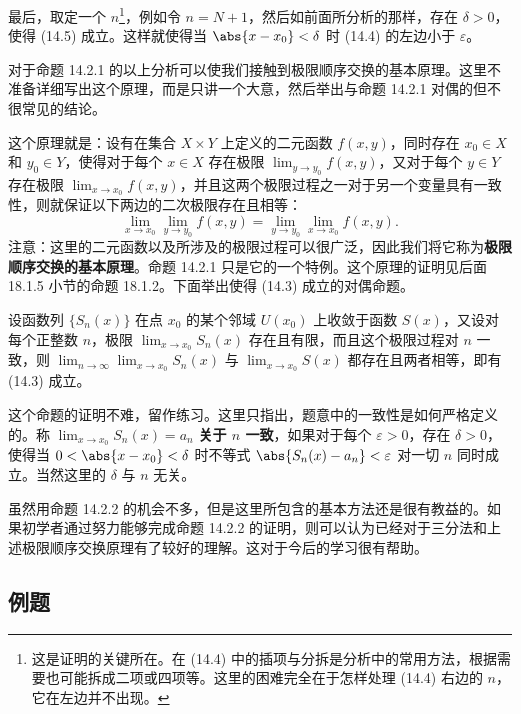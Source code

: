 最后，取定一个 $n$\footnote{这是证明的关键所在。在 (14.4) 中的插项与分拆是分析中的常用方法，根据需要也可能拆成二项或四项等。这里的困难完全在于怎样处理 (14.4) 右边的 $n$，它在左边并不出现。}，例如令 $n=N+1$，然后如前面所分析的那样，存在 $\delta>0$，使得 (14.5) 成立。这样就使得当 $\abs{x-x_0}<\delta$ 时 (14.4) 的左边小于 $\varepsilon$。

\begin{xremark}
对于命题 14.2.1 的以上分析可以使我们接触到极限顺序交换的基本原理。这里不准备详细写出这个原理，而是只讲一个大意，然后举出与命题 14.2.1 对偶的但不很常见的结论。
\end{xremark}

这个原理就是：设有在集合 $X\times Y$ 上定义的二元函数 $f(x,y)$，同时存在 $x_0\in X$ 和 $y_0\in Y$，使得对于每个 $x\in X$ 存在极限 $\displaystyle\lim_{y\to y_0}f(x,y)$，又对于每个 $y\in Y$ 存在极限 $\displaystyle\lim_{x\to x_0}f(x,y)$，并且这两个极限过程之一对于另一个变量具有一致性，则就保证以下两边的二次极限存在且相等：
\[
  \lim_{x\to x_0}\lim_{y\to y_0}f(x,y)=\lim_{y\to y_0}\lim_{x\to x_0}f(x,y).
\]
注意：这里的二元函数以及所涉及的极限过程可以很广泛，因此我们将它称为\textbf{极限顺序交换的基本原理}。命题 14.2.1 只是它的一个特例。这个原理的证明见后面 18.1.5 小节的命题 18.1.2。下面举出使得 (14.3) 成立的对偶命题。

\begin{xproposition}[14.2.2]
设函数列 $\{S_n(x)\}$ 在点 $x_0$ 的某个邻域 $U(x_0)$ 上收敛于函数 $S(x)$，又设对每个正整数 $n$，极限 $\displaystyle\lim_{x\to x_0}S_n(x)$ 存在且有限，而且这个极限过程对 $n$ 一致，则 $\displaystyle\lim_{n\to\infty}\lim_{x\to x_0}S_n(x)$ 与 $\displaystyle\lim_{x\to x_0}S(x)$ 都存在且两者相等，即有 (14.3) 成立。
\end{xproposition}

这个命题的证明不难，留作练习。这里只指出，题意中的一致性是如何严格定义的。称 $\displaystyle\lim_{x\to x_0}S_n(x)=a_n$ \textbf{关于 $n$ 一致}，如果对于每个 $\varepsilon>0$，存在 $\delta>0$，使得当 $0<\abs{x-x_0}<\delta$ 时不等式 $\abs{S_n(x)-a_n}<\varepsilon$ 对一切 $n$ 同时成立。当然这里的 $\delta$ 与 $n$ 无关。

虽然用命题 14.2.2 的机会不多，但是这里所包含的基本方法还是很有教益的。如果初学者通过努力能够完成命题 14.2.2 的证明，则可以认为已经对于三分法和上述极限顺序交换原理有了较好的理解。这对于今后的学习很有帮助。

\subsection{例题}

